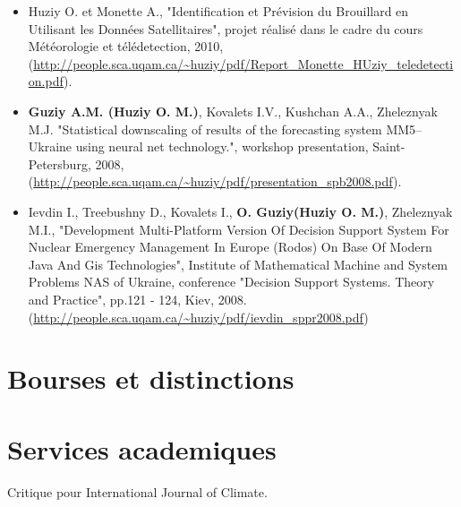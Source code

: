 \documentclass[12pt,a4paper,sans]{moderncv} %
\begin{document}
\begin{itemize}
    \item Huziy O. et Monette A., "Identification et Prévision du
    Brouillard en Utilisant les Données Satellitaires", projet réalisé dans le cadre du cours Météorologie et télédetection,
       2010, (\url{http://people.sca.uqam.ca/~huziy/pdf/Report_Monette_HUziy_teledetection.pdf}).

    \item \textbf{Guziy A.M. (Huziy O. M.)}, Kovalets I.V., Kushchan A.A.,
    Zheleznyak M.J.
    "Statistical downscaling of results of the forecasting system MM5–Ukraine using neural net technology.",
    workshop presentation, Saint-Petersburg, 2008, (\url{http://people.sca.uqam.ca/~huziy/pdf/presentation_spb2008.pdf}).

    \item Ievdin I., Treebushny D., Kovalets I., \textbf{O. Guziy(Huziy O.
    M.)}, Zheleznyak M.I., "Development Multi-Platform Version Of Decision
    Support System For Nuclear Emergency Management In Europe (Rodos) On Base Of Modern Java And Gis Technologies", 
    Institute of Mathematical Machine and System Problems NAS of Ukraine, conference
    "Decision Support Systems. Theory and Practice", pp.121 - 124, Kiev, 2008.
     (\url{http://people.sca.uqam.ca/~huziy/pdf/ievdin_sppr2008.pdf})

\end{itemize}


\section{Bourses et distinctions}


\section{Services academiques}
Critique pour International Journal of Climate.
\end{document}

